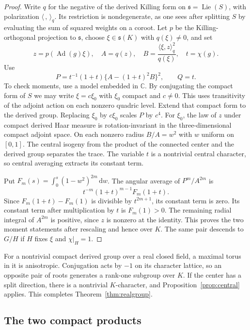 \documentclass[11pt]{article}
\newcommand{\CC}{\mathbb C}
\newcommand{\Lie}{\operatorname{Lie}}
\newcommand{\dd}{\,\mathrm d}
\DeclareMathOperator{\Ad}{Ad}
\begin{document}
\begin{proof}
Write \(q\) for the negative of the derived Killing form on
\(\mathfrak s=\Lie(S)\), with polarization \(\langle\,,\,\rangle_q\).
Its restriction is nondegenerate, as one sees after splitting \(S\)
by evaluating the sum of squared weights on a coroot. Let \(p\) be
the Killing-orthogonal projection to \(\mathfrak s\), choose
\(\xi\in\mathfrak s(K)\) with \(q(\xi)\ne0\), and set
\[
 z=p(\Ad(g)\xi),\quad A=q(z),\quad
 B=\frac{\langle\xi,z\rangle_q^2}{q(\xi)},\quad t=\chi(g).
\]
Use
\begin{equation}\label{eq:angular}
 P=t^{-1}(1+t)\{A-(1+t)^2B\}^{2},\qquad Q=t .
\end{equation}
To check moments, use a model embedded in \(\CC\). By conjugating
the compact form of \(S\) we may write \(\xi=c\xi_0\) with \(\xi_0\)
compact and \(c\ne0\). This uses transitivity of the adjoint action
on each nonzero quadric level. Extend that compact form to the
derived group. Replacing \(\xi_0\) by \(c\xi_0\) scales \(P\) by
\(c^4\). For \(\xi_0\), the law of \(z\) under compact derived Haar
measure is rotation-invariant in the three-dimensional compact
adjoint space. On each nonzero radius \(B/A=w^2\) with \(w\)
uniform on \([0,1]\). The central isogeny from the product of the
connected center and the derived group separates the trace.
The variable \(t\) is a nontrivial central character, so central
averaging extracts its constant term.

Put \(F_m(s)=\int_0^s(1-w^2)^{2m}\dd w\). The angular average of
\(P^m/A^{2m}\) is
\[
                  t^{-m}(1+t)^{m-1}F_m(1+t).
\]
Since \(F_m(1+t)-F_m(1)\) is divisible by \(t^{2m+1}\), its constant
term is zero. Its constant term after multiplication by \(t\)
is \(F_m(1)>0\). The remaining radial integral of \(A^{2m}\)
is positive, since \(z\) is nonzero at the identity. This proves
the two moment statements after rescaling and hence over \(K\).
The same pair descends to \(G/H\) if \(H\) fixes \(\xi\) and
\(\chi|_H=1\).
\end{proof}

For a nontrivial compact derived group over a real closed field,
a maximal torus in it is anisotropic. Conjugation acts by \(-1\)
on its character lattice, so an opposite pair of roots generates
a rank-one subgroup over \(K\). If the center has a split direction,
there is a nontrivial \(K\)-character, and Proposition~\ref{prop:central}
applies. This completes Theorem~\ref{thm:realgroup}.

\subsection*{The two compact products}
\end{document}
